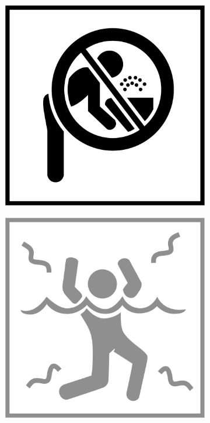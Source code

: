 \begin{figure}[H]
\begin{subfigure}[l]{0.195\linewidth}
  \end{subfigure}
  \begin{subfigure}[l]{0.195\linewidth}
    \includegraphics[width=\textwidth]{Sources/PortalIcons/8.jpg}
  \end{subfigure}
  \begin{subfigure}[l]{0.195\linewidth}
    \includegraphics[width=\textwidth]{Sources/PortalIcons/d9.jpg}

\end{subfigure}
\end{figure}
